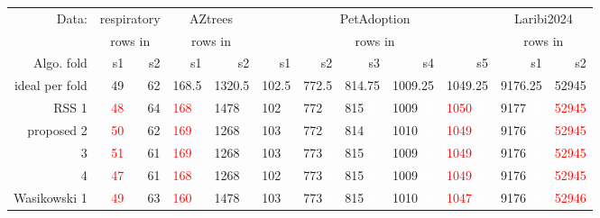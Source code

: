 \documentclass[twoside]{article}
\begin{document}
\begin{table}[ht]
  \centering
    \small
\begin{tabular}{|r|rr|rr|rrrrr|rr|}
  \hline
  Data: & \multicolumn{2}{c|}{respiratory}& \multicolumn{2}{c|}{AZtrees}& \multicolumn{5}{c|}{PetAdoption} & \multicolumn{2}{c|}{Laribi2024}\\
   & \multicolumn{2}{c|}{rows in}& \multicolumn{2}{c|}{rows in}& \multicolumn{5}{c|}{rows in}&\multicolumn{2}{c|}{rows in}\\
Algo. fold & s1 & s2 & s1 & s2 & s1 & s2 & s3 & s4 & s5 & s1 & s2 \\ 
  \hline
  ideal per fold   & 49 & 62 & 168.5 & 1320.5 & 102.5 & 772.5 & 814.75 & 1009.25 & 1049.25 & 9176.25 &52945 \\ 
  \hline
RSS 1 & \textcolor{red}{48} & 64 & \textcolor{red}{168}\textcolor{white}{.0} & 1478\textcolor{white}{.0} & 102\textcolor{white}{.0} & 772\textcolor{white}{.0} & 815\textcolor{white}{.00} & 1009\textcolor{white}{.00} & \textcolor{red}{1050}\textcolor{white}{.00} & 9177\textcolor{white}{.00} & \textcolor{red}{52945} \\ 
  proposed 2 & \textcolor{red}{50} & 62 & \textcolor{red}{169}\textcolor{white}{.0} & 1268\textcolor{white}{.0} & 103\textcolor{white}{.0} & 772\textcolor{white}{.0} & 814\textcolor{white}{.00} & 1010\textcolor{white}{.00} & \textcolor{red}{1049}\textcolor{white}{.00} & 9176\textcolor{white}{.00} & \textcolor{red}{52945} \\ 
   3 & \textcolor{red}{51} & 61 & \textcolor{red}{169}\textcolor{white}{.0} & 1268\textcolor{white}{.0} & 103\textcolor{white}{.0} & 773\textcolor{white}{.0} & 815\textcolor{white}{.00} & 1009\textcolor{white}{.00} & \textcolor{red}{1049}\textcolor{white}{.00} & 9176\textcolor{white}{.00} & \textcolor{red}{52945} \\ 
   4 & \textcolor{red}{47} & 61 & \textcolor{red}{168}\textcolor{white}{.0} & 1268\textcolor{white}{.0} & 102\textcolor{white}{.0} & 773\textcolor{white}{.0} & 815\textcolor{white}{.00} & 1009\textcolor{white}{.00} & \textcolor{red}{1049}\textcolor{white}{.00} & 9176\textcolor{white}{.00} & \textcolor{red}{52945} \\ 
  \hline
  Wasikowski 1 & \textcolor{red}{49} & 63 & \textcolor{red}{160}\textcolor{white}{.0} & 1478\textcolor{white}{.0} & 103\textcolor{white}{.0} & 773\textcolor{white}{.0} & 815\textcolor{white}{.00} & 1010\textcolor{white}{.00} & \textcolor{red}{1047}\textcolor{white}{.00} & 9176\textcolor{white}{.00} & \textcolor{red}{52946} \\ 

\end{tabular}
\end{table}
\end{document}
